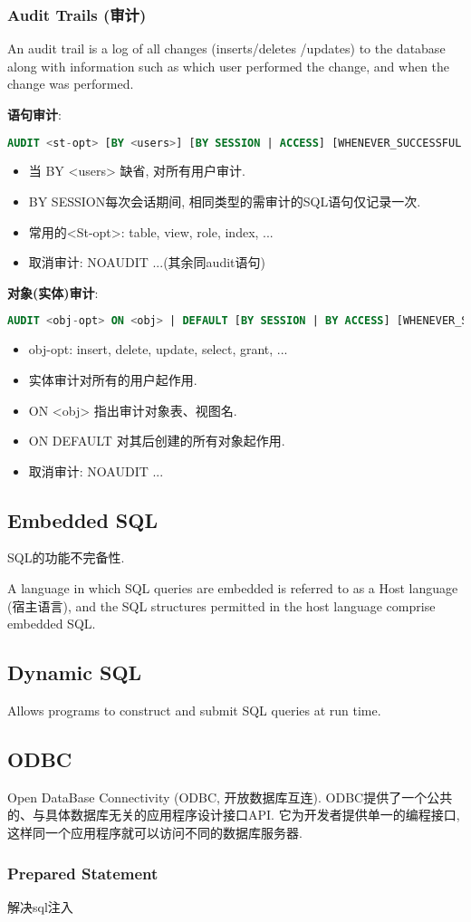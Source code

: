 \subsubsection{Audit Trails (审计)}
An audit trail is a log of all changes (inserts/deletes /updates) to the database along with information such as which user performed the change, and when the change was performed.

\textbf{语句审计}:
\begin{lstlisting}[language=sql,morekeywords={REFERENCES, WITH}]
AUDIT <st-opt> [BY <users>] [BY SESSION | ACCESS] [WHENEVER_SUCCESSFUL | WHENEVER_NOT_SUCCESSFUL]
\end{lstlisting}
\begin{itemize}
    \item 当 BY <users> 缺省, 对所有用户审计. 
    \item BY SESSION每次会话期间, 相同类型的需审计的SQL语句仅记录一次. 
    \item 常用的<St-opt>: table, view, role, index, ...
    \item 取消审计: NOAUDIT ...(其余同audit语句)
\end{itemize}

\textbf{对象(实体)审计}:
\begin{lstlisting}[language=sql,morekeywords={REFERENCES, WITH}]
AUDIT <obj-opt> ON <obj> | DEFAULT [BY SESSION | BY ACCESS] [WHENEVER_SUCCESSFUL | WHENEVER_NOT_SUCCESSFUL]
\end{lstlisting}
\begin{itemize}
    \item obj-opt: insert, delete, update, select, grant, ...
    \item 实体审计对所有的用户起作用. 
    \item ON <obj> 指出审计对象表、视图名. 
    \item ON DEFAULT 对其后创建的所有对象起作用. 
    \item 取消审计: NOAUDIT ...
\end{itemize}

\subsection{Embedded SQL}
SQL的功能不完备性. 

A language in which SQL queries are embedded is referred to as a Host language (宿主语言), and the SQL structures permitted in the host language comprise embedded SQL.

\subsection{Dynamic SQL}
Allows programs to construct and submit SQL queries at run time.

\subsection{ODBC}

Open DataBase Connectivity (ODBC, 开放数据库互连). ODBC提供了一个公共的、与具体数据库无关的应用程序设计接口API. 它为开发者提供单一的编程接口, 这样同一个应用程序就可以访问不同的数据库服务器. 

\subsubsection{Prepared Statement}
解决sql注入